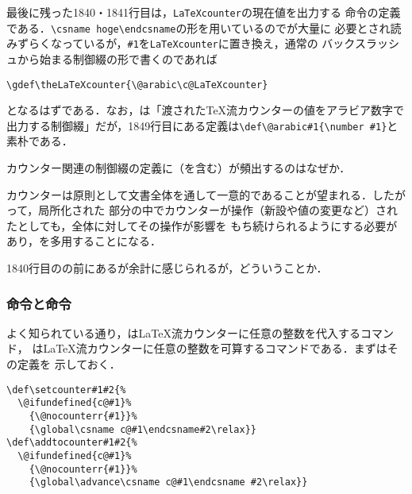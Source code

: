 \documentclass[autodetect-engine,dvipdfmx]{jsarticle}
\begin{document}
最後に残った1840・1841行目は，\texttt{LaTeXcounter}の現在値を出力する
命令の定義である．\verb|\csname hoge\endcsname|の形を用いているのでが大量に
必要とされ読みずらくなっているが，\verb|#1|を\texttt{LaTeXcounter}に置き換え，通常の
バックスラッシュから始まる制御綴の形で書くのであれば
\texsource
\begin{lstlisting}
\gdef\theLaTeXcounter{\@arabic\c@LaTeXcounter}
\end{lstlisting}
となるはずである．なお，は「渡された\TeX 流カウンターの値をアラビア数字で
出力する制御綴」だが，1849行目にある定義は\verb|\def\@arabic#1{\number #1}|と素朴である．

\begin{question}
カウンター関連の制御綴の定義に（を含む）が頻出するのはなぜか．
\end{question}
\begin{answer}
カウンターは原則として文書全体を通して一意的であることが望まれる．したがって，局所化された
部分の中でカウンターが操作（新設や値の変更など）されたとしても，全体に対してその操作が影響を
もち続けられるようにする必要があり，を多用することになる．
\end{answer}

\begin{question}
1840行目のの前にあるが余計に感じられるが，どういうことか．
\end{question}

\newpage

\subsubsection{命令と命令}

よく知られている通り，は\LaTeX 流カウンターに任意の整数を代入するコマンド，
は\LaTeX 流カウンターに任意の整数を可算するコマンドである．まずはその定義を
示しておく．
\latexltx
\begin{lstlisting}[firstnumber=1811]
\def\setcounter#1#2{%
  \@ifundefined{c@#1}%
    {\@nocounterr{#1}}%
    {\global\csname c@#1\endcsname#2\relax}}
\def\addtocounter#1#2{%
  \@ifundefined{c@#1}%
    {\@nocounterr{#1}}%
    {\global\advance\csname c@#1\endcsname #2\relax}}
\end{lstlisting}
\end{document}
